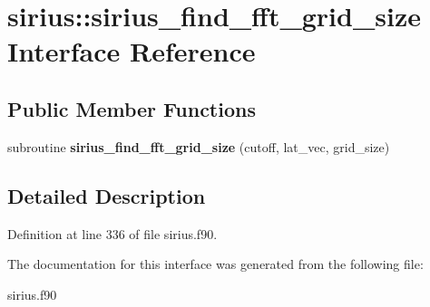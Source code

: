 \hypertarget{interfacesirius_1_1sirius__find__fft__grid__size}{}\section{sirius\+:\+:sirius\+\_\+find\+\_\+fft\+\_\+grid\+\_\+size Interface Reference}
\label{interfacesirius_1_1sirius__find__fft__grid__size}
\subsection*{Public Member Functions}
\begin{DoxyCompactItemize}
\item 
\hypertarget{interfacesirius_1_1sirius__find__fft__grid__size_af32e8dbc1b0eb048f72bfeb37ab408c7}{}subroutine {\bfseries sirius\+\_\+find\+\_\+fft\+\_\+grid\+\_\+size} (cutoff, lat\+\_\+vec, grid\+\_\+size)\label{interfacesirius_1_1sirius__find__fft__grid__size_af32e8dbc1b0eb048f72bfeb37ab408c7}

\end{DoxyCompactItemize}


\subsection{Detailed Description}


Definition at line 336 of file sirius.\+f90.



The documentation for this interface was generated from the following file\+:\begin{DoxyCompactItemize}
\item 
sirius.\+f90\end{DoxyCompactItemize}
